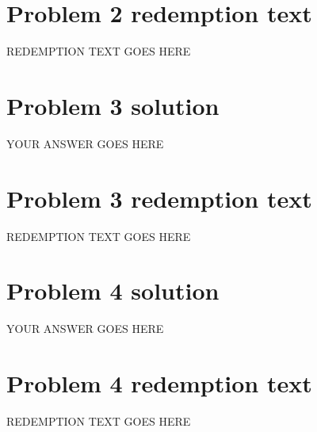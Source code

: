 \documentclass[11pt]{article}
\begin{document}
\newpage
\section*{Problem 2 redemption text}
REDEMPTION TEXT GOES HERE

\newpage
\section*{Problem 3 solution}
YOUR ANSWER GOES HERE

\newpage
\section*{Problem 3 redemption text}
REDEMPTION TEXT GOES HERE

\newpage
\section*{Problem 4 solution}
YOUR ANSWER GOES HERE

\newpage
\section*{Problem 4 redemption text}
REDEMPTION TEXT GOES HERE
\end{document}
